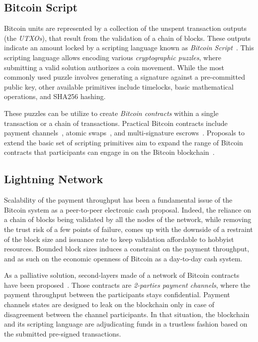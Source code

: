 \documentclass[pdflatex,sn-mathphys]{sn-jnl}%
\theoremstyle{thmstyleone}%
\theoremstyle{thmstyletwo}%
\theoremstyle{thmstylethree}%
\begin{document}
\subsection{Bitcoin Script}

Bitcoin units are represented by a collection of the unspent transaction outputs (the \textit{UTXOs}), that result from the validation of a chain of blocks. These outputs indicate an amount locked by a scripting language known as \textit{Bitcoin Script}~\cite{Script2023Bitcoinwiki}. This scripting language allows encoding various \textit{cryptographic puzzles}, where submitting a valid solution authorizes a coin movement. While the most commonly used puzzle involves generating a signature against a pre-committed public key, other available primitives include timelocks, basic mathematical operations, and SHA256 hashing. 

These puzzles can be utilize to create \textit{Bitcoin contracts} within a single transaction or a chain of transactions. Practical Bitcoin contracts include payment channels~\cite{Channels2013Hearn}, atomic swaps~\cite{Atomic2013Nolan}, and multi-signature escrows~\cite{Multisig2011Andresen}. Proposals to extend the basic set of scripting primitives aim to expand the range of Bitcoin contracts that participants can engage in on the Bitcoin blockchain~\cite{Covenants2023Optech}.

\subsection{Lightning Network}

Scalability of the payment throughput has been a fundamental issue of the Bitcoin system as a peer-to-peer electronic cash proposal. Indeed, the reliance on a chain of blocks being validated by all the nodes of the network, while removing the trust risk of a few points of failure, comes up with the downside of a restraint of the block size and issuance rate to keep validation affordable to hobbyist resources. Bounded block sizes induces a constraint on the payment throughput, and as such on the economic openness of Bitcoin as a day-to-day cash system.

As a palliative solution, second-layers made of a network of Bitcoin contracts have been proposed~\cite{Hub2014Todd}. Those contracts are \textit{2-parties payment channels}, where the payment throughput between the participants stays confidential. Payment channels states are designed to leak on the blockchain only in case of disagreement between the channel participants. In that situation, the blockchain and its scripting language are adjudicating funds in a trustless fashion based on the submitted pre-signed transactions.
\end{document}
